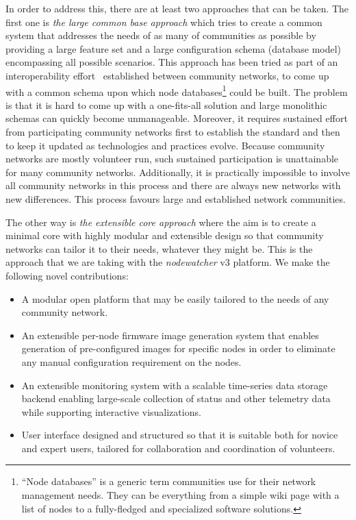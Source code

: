 \documentclass[5p,sort&compress]{elsarticle}
\newcommand{\nodewatcher}{\textit{nodewatcher}}
\begin{document}
In order to address this, there are at least two approaches that can be taken.
The first one is \textit{the large common base approach} which tries to create a common system that addresses the needs of as many of communities as possible by providing a large feature set and a large configuration schema (database model) encompassing all possible scenarios.
This approach has been tried as part of an interoperability effort~\cite{interop_2010, cnml_2007} established between community networks, to come up with a common schema upon which node databases\footnote{``Node databases'' is a generic term communities use for their network management needs. They can be everything from a simple wiki page with a list of nodes to a fully-fledged and specialized software solutions.} could be built.
The problem is that it is hard to come up with a one-fits-all solution and large monolithic schemas can quickly become unmanageable.
Moreover, it requires sustained effort from participating community networks first to establish the standard and then to keep it updated as technologies and practices evolve.
Because community networks are mostly volunteer run, such sustained participation is unattainable for many community networks.
Additionally, it is practically impossible to involve all community networks in this process and there are always new networks with new differences.
This process favours large and established network communities.

The other way is \textit{the extensible core approach} where the aim is to create a minimal core with highly modular and extensible design so that community networks can tailor it to their needs, whatever they might be.
This is the approach that we are taking with the \nodewatcher{} v3 platform.
We make the following novel contributions:
\begin{itemize}
\item A modular open platform that may be easily tailored to the needs of any community network.
\item An extensible per-node firmware image generation system that enables generation of pre-configured images for specific nodes in order to eliminate any manual configuration requirement on the nodes.
\item An extensible monitoring system with a scalable time-series data storage backend enabling large-scale collection of status and other telemetry data while supporting interactive visualizations.
\item User interface designed and structured so that it is suitable both for novice and expert users, tailored for collaboration and coordination of volunteers.
\end{itemize}
\end{document}
